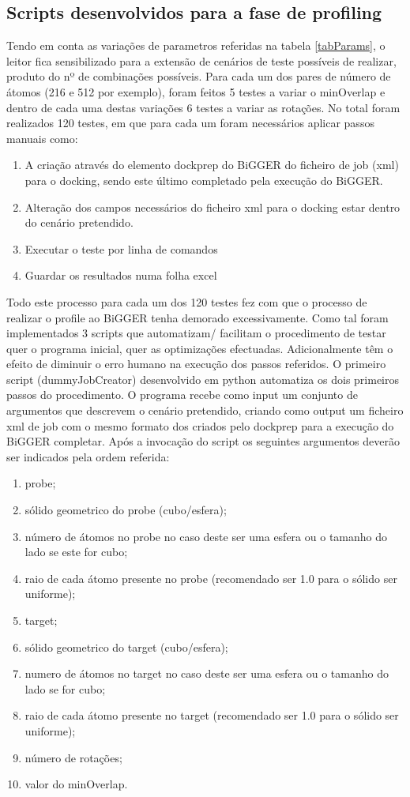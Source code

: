 \subsection{Scripts desenvolvidos para a fase de profiling}
Tendo em conta as variações de parametros referidas na tabela \ref{tabParams}, o leitor fica sensibilizado para a extensão de cenários de teste possíveis de realizar, produto do nº de combinações possíveis. Para cada um dos pares de número de átomos (216 e 512 por exemplo), foram feitos 5 testes a variar o minOverlap e dentro de cada uma destas variações 6 testes a variar as rotações. No total foram realizados 120 testes, em que para cada um foram necessários aplicar passos manuais como:
\begin{enumerate}
	\item{A criação através do elemento dockprep do BiGGER do ficheiro de job (xml) para o docking, sendo este último completado pela execução do BiGGER.}
	\item{Alteração dos campos necessários do ficheiro xml para o docking estar dentro do cenário pretendido. }
	\item{Executar o teste por linha de comandos}
	\item{Guardar os resultados numa folha excel}
\end{enumerate} 
Todo este processo para cada um dos 120 testes fez com que o processo de realizar o profile ao BiGGER tenha demorado excessivamente. Como tal foram implementados 3 scripts que automatizam/ facilitam o procedimento de testar quer o programa inicial, quer as optimizações efectuadas. Adicionalmente têm o efeito de diminuir o erro humano na execução dos passos referidos. O primeiro script (dummyJobCreator) desenvolvido em python automatiza os dois primeiros passos do procedimento. O programa recebe como input um conjunto de argumentos que descrevem o cenário pretendido, criando como output um ficheiro xml de job com o mesmo formato dos criados pelo dockprep para a execução do BiGGER completar. Após a invocação do script os seguintes argumentos deverão ser indicados pela ordem referida:
\begin{enumerate}
	\item{probe;}
	\item{sólido geometrico do probe (cubo/esfera);}
	\item{número de átomos no probe no caso deste ser uma esfera ou o tamanho do lado se este for cubo;}
	\item{raio de cada átomo presente no probe (recomendado ser 1.0 para o sólido ser uniforme);}
	\item{target;}
	\item{sólido geometrico do target (cubo/esfera);}
	\item{numero de átomos no target no caso deste ser uma esfera ou o tamanho do lado se for cubo;}
	\item{raio de cada átomo presente no target  (recomendado ser 1.0 para o sólido ser uniforme);}
	\item{número de rotações;}
	\item{valor do minOverlap.}
\end{enumerate} 
